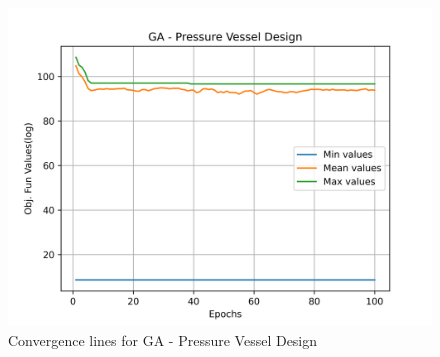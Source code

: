 \begin{figure}[H]
        \centering
        \caption{Convergence lines for GA - Pressure Vessel Design}
        \label{fig:pressure_vessel_problem_solve_ga}
        \includegraphics[scale=0.5]{images/pressure_vessel_problem_solve_ga.png}
        \end{figure}
        